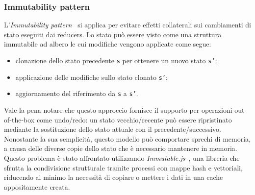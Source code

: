 \subsubsection*{Immutability pattern}
L'\emph{Immutability pattern}~\cite{immutability} si applica per evitare effetti collaterali sui cambiamenti di stato
eseguiti dai reducers. Lo stato può essere visto come una struttura immutabile ad albero le cui modifiche vengono applicate come segue:
\begin{itemize}
  \item clonazione dello stato precedente \texttt{s} per ottenere un nuovo stato \texttt{s'};
  \item applicazione delle modifiche sullo stato clonato \texttt{s'};
  \item aggiornamento del riferimento da \texttt{s} a \texttt{s'}.
\end{itemize}
Vale la pena notare che questo approccio fornisce il supporto per operazioni out-of-the-box come undo/redo:
un stato vecchio/recente può essere ripristinato mediante la sostituzione dello stato attuale con il precedente/successivo.
Nonostante la sua semplicità, questo modello può comportare sprechi di memoria, a causa delle diverse copie dello
stato che è necessario mantenere in memoria. Questo problema è stato affrontato utilizzando \emph{Immutable.js}~\cite{immutable-js}, una libreria che sfrutta la condivisione strutturale tramite
processi con mappe hash e vettoriali, riducendo al minimo la necessità di copiare o mettere i dati in una cache appositamente creata.
\newpage
